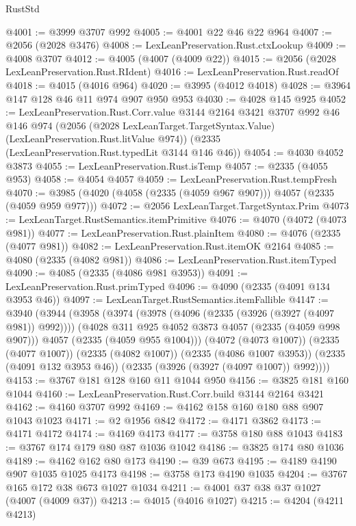 \begin{lexlean}{RustStd}
\begin{coremodule}
@4001 := @3999 @3707 @992
@4005 := @4001 @22 @46 @22 @964
@4007 := @2056 (@2028 @3476)
@4008 := LexLeanPreservation.Rust.ctxLookup
@4009 := @4008 @3707
@4012 := @4005 (@4007 (@4009 @22))
@4015 := @2056 (@2028 LexLeanPreservation.Rust.RIdent)
@4016 := LexLeanPreservation.Rust.readOf
@4018 := @4015 (@4016 @964)
@4020 := @3995 (@4012 @4018)
@4028 := @3964 @147 @128 @46 @11 @974 @907 @950 @953
@4030 := @4028 @145 @925
@4052 := LexLeanPreservation.Rust.Corr.value
    @3144
    @2164
    @3421
    @3707
    @992
    @46
    @146
    @974
    (@2056 (@2028 LexLeanTarget.TargetSyntax.Value) (LexLeanPreservation.Rust.litValue @974))
    (@2335 (LexLeanPreservation.Rust.typedLit @3144 @146 @46))
@4054 := @4030 @4052 @3873
@4055 := LexLeanPreservation.Rust.isTemp
@4057 := @2335 (@4055 @953)
@4058 := @4054 @4057
@4059 := LexLeanPreservation.Rust.tempFresh
@4070 := @3985 (@4020 (@4058 (@2335 (@4059 @967 @907))) @4057 (@2335 (@4059 @959 @977)))
@4072 := @2056 LexLeanTarget.TargetSyntax.Prim
@4073 := LexLeanTarget.RustSemantics.itemPrimitive
@4076 := @4070 (@4072 (@4073 @981))
@4077 := LexLeanPreservation.Rust.plainItem
@4080 := @4076 (@2335 (@4077 @981))
@4082 := LexLeanPreservation.Rust.itemOK @2164
@4085 := @4080 (@2335 (@4082 @981))
@4086 := LexLeanPreservation.Rust.itemTyped
@4090 := @4085 (@2335 (@4086 @981 @3953))
@4091 := LexLeanPreservation.Rust.primTyped
@4096 := @4090 (@2335 (@4091 @134 @3953 @46))
@4097 := LexLeanTarget.RustSemantics.itemFallible
@4147 := @3940
    (@3944
      (@3958
        (@3974
          (@3978 (@4096 (@2335 (@3926 (@3927 (@4097 @981)) @992))))
          (@4028 @311 @925 @4052 @3873 @4057 (@2335 (@4059 @998 @907)))
          @4057
          (@2335 (@4059 @955 @1004)))
        (@4072 (@4073 @1007))
        (@2335 (@4077 @1007))
        (@2335 (@4082 @1007))
        (@2335 (@4086 @1007 @3953))
        (@2335 (@4091 @132 @3953 @46))
        (@2335 (@3926 (@3927 (@4097 @1007)) @992))))
@4153 := @3767 @181 @128 @160 @11 @1044 @950
@4156 := @3825 @181 @160 @1044
@4160 := LexLeanPreservation.Rust.Corr.build @3144 @2164 @3421
@4162 := @4160 @3707 @992
@4169 := @4162 @158 @160 @180 @88 @907 @1043 @1023
@4171 := @2 @1956 @842
@4172 := @4171 @3862
@4173 := @4171 @4172
@4174 := @4169 @4173
@4177 := @3758 @180 @88 @1043
@4183 := @3767 @174 @179 @80 @87 @1036 @1042
@4186 := @3825 @174 @80 @1036
@4189 := @4162 @162 @80 @173
@4190 := @39 @673
@4195 := @4189 @4190 @907 @1035 @1025 @4173
@4198 := @3758 @173 @4190 @1035
@4204 := @3767 @165 @172 @38 @673 @1027 @1034
@4211 := @4001 @37 @38 @37 @1027 (@4007 (@4009 @37))
@4213 := @4015 (@4016 @1027)
@4215 := @4204 (@4211 @4213)

\end{coremodule}
\end{lexlean}
